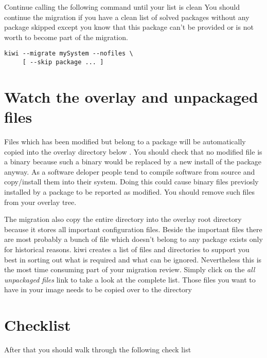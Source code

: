Continue calling the following command until your list is clean
You should continue the migration if you have a clean list of solved
packages without any package skipped except you know that this package
can't be provided or is not worth to become part of the migration.

\begin{Command}{14cm}
\begin{verbatim}
kiwi --migrate mySystem --nofiles \
     [ --skip package ... ]
\end{verbatim}
\end{Command}

\section{Watch the overlay and unpackaged files}
Files which has been modified but belong to a package will be
automatically copied into the overlay directory below
. You should check that no modified file
is a binary because such a binary would be replaced by a new
install of the package anyway. As a software deloper people
tend to compile software from source and copy/install them
into their system. Doing this could cause binary files previosly
installed by a package to be reported as modified. You should
remove such files from your overlay tree.

The migration also copy the entire  directory into the
overlay root directory because it stores all important configuration
files. Beside the important files there are most probably a bunch
of file which doesn't belong to any package exists only for
historical reasons. kiwi creates a list of files and
directories to support you best in sorting out what is required
and what can be ignored. Nevertheless this is the most
time consuming part of your migration review. Simply click on
the \textit{all unpackaged files} link to take a look at the
complete list. Those files you want to have in your image needs
to be copied over to the  directory

\section{Checklist}
After that you should walk through the following check list

